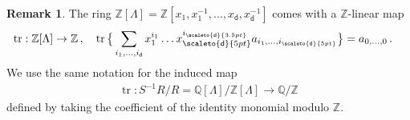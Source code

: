 \documentclass[sn-mathphys-num]{sn-jnl}
\theoremstyle{definition}
\newtheorem{remark}[lemma]{Remark}
\numberwithin{equation}{section}
\theoremstyle{definition}
\def\IQ{\mathbb{Q}}
\def\IZ{{\mathbb{Z}}}
\def\La{{\Lambda}}
\def\tr{\operatorname{tr}}
\newcommand{\dd}{{\mathsf{d}}} %
\begin{document}
\begin{remark}\label{remark_commutator}
    The ring $\IZ[\La]=\IZ[x_1,x_1^{-1},\ldots, x_{\dd},x_{\dd}^{-1}]$ comes with a $\IZ$-linear map
\begin{align}
    \tr:\IZ[\La] \to \IZ\,,\quad &\tr\big\{ \sum_{i_1,\dots, i_\dd}x_1^{i_1}\dots x_{{\scaleto{\dd}{5pt}}}^{i_{\scaleto{\dd}{3.5pt}}}a_{i_1,\dots, i_{{\scaleto{\dd}{5pt}}}}\big\} =a_{0,\dots, 0}\,.
\end{align}
We use the same notation for the induced map \begin{align} \tr:S^{-1}R/R=\IQ[\La]/\IZ[\La]\longrightarrow\IQ/\IZ \end{align} defined by taking the coefficient of the identity monomial modulo $\IZ$.
\end{remark}
\vspace{3mm}
\end{document}
